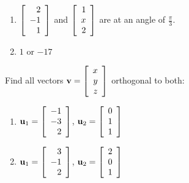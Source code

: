 \begin{multicols}{2}
\begin{ex}
\begin{enumerate}[label={\alph*.}]
\item $\left[
\begin{array}{r}
2\\
-1\\
1
\end{array}
\right]$
and 
$\left[
\begin{array}{r}
1\\
x\\
2
\end{array}
\right]$
are at an angle of $\frac{\pi}{3}$.

\end{enumerate}
\begin{sol}
\begin{enumerate}[label={\alph*.}]
\setcounter{enumi}{1}
\item  $1$ or $-17$

\end{enumerate}
\end{sol}
\end{ex}

\begin{ex}
Find all vectors $\textbf{v} = \left[
\begin{array}{r}
x\\
y\\
z
\end{array}
\right]$ orthogonal to both:


\begin{enumerate}[label={\alph*.}]
\item $\textbf{u}_{1} = \left[
\begin{array}{r}
-1\\
-3\\
2
\end{array}
\right]$,
$\textbf{u}_{2} = \left[
\begin{array}{r}
0\\
1\\
1
\end{array}
\right]
$

\item $\textbf{u}_{1} = \left[
\begin{array}{r}
3\\
-1\\
2
\end{array}
\right]$, 
$\textbf{u}_{2} = \left[
\begin{array}{r}
2\\
0\\
1
\end{array}
\right]
$


\end{enumerate}
\end{ex}
\end{multicols}
